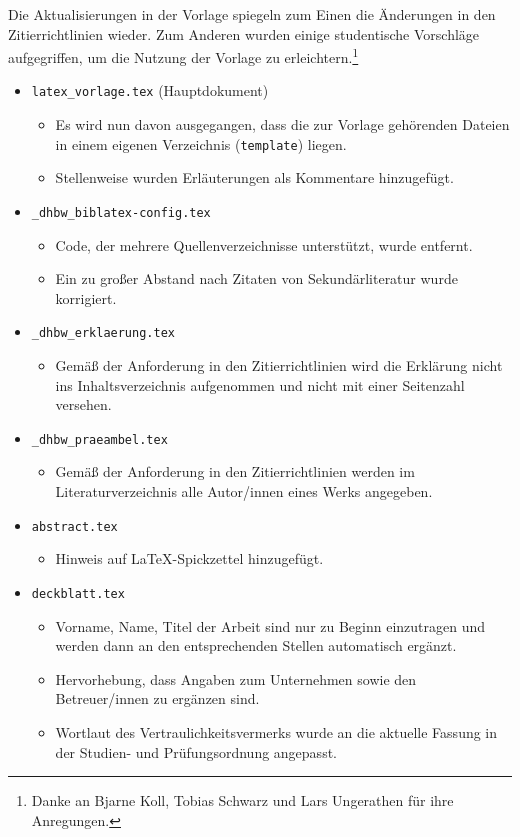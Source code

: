 Die Aktualisierungen in der Vorlage spiegeln zum Einen die Änderungen in den Zitierrichtlinien wieder. Zum Anderen wurden einige studentische Vorschläge aufgegriffen, um die Nutzung der Vorlage zu erleichtern.\footnote{Danke an Bjarne Koll, Tobias Schwarz und Lars Ungerathen für ihre Anregungen.} 

\begin{itemize}

\item \verb|latex_vorlage.tex| (Hauptdokument)
\begin{itemize}
\item Es wird nun davon ausgegangen, dass die zur Vorlage gehörenden Dateien in einem eigenen Verzeichnis (\verb|template|) liegen.
\item Stellenweise wurden Erläuterungen als Kommentare hinzugefügt.
\end{itemize}

\item \verb|_dhbw_biblatex-config.tex|
\begin{itemize}
\item Code, der mehrere Quellenverzeichnisse unterstützt, wurde entfernt.
\item Ein zu großer Abstand nach Zitaten von Sekundärliteratur wurde korrigiert. 
\end{itemize}

\item \verb|_dhbw_erklaerung.tex|
\begin{itemize}
\item Gemäß der Anforderung in den Zitierrichtlinien wird die Erklärung nicht ins Inhaltsverzeichnis aufgenommen und nicht mit einer Seitenzahl versehen. 
\end{itemize}

\pagebreak
\item \verb|_dhbw_praeambel.tex|
\begin{itemize}
\item Gemäß der Anforderung in den Zitierrichtlinien werden im Literaturverzeichnis alle Autor/innen eines Werks angegeben.
\end{itemize}

\item \verb|abstract.tex|
\begin{itemize}
\item Hinweis auf \LaTeX-Spickzettel hinzugefügt.
\end{itemize}

\item \verb|deckblatt.tex|
\begin{itemize}
\item Vorname, Name, Titel der Arbeit sind nur zu Beginn einzutragen und werden dann an den entsprechenden Stellen automatisch ergänzt.
\item Hervorhebung, dass Angaben zum Unternehmen sowie den Betreuer/innen zu ergänzen sind. 
\item Wortlaut des Vertraulichkeitsvermerks wurde an die aktuelle Fassung in der Studien- und Prüfungsordnung angepasst. 
\end{itemize}


\end{itemize}
